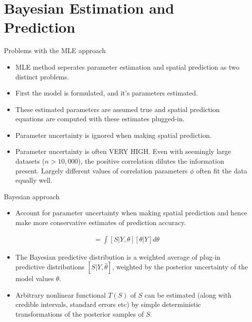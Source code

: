 \documentclass{beamer}
\begin{document}
\section{Bayesian Estimation and Prediction}

\begin{frame}{Problems with the MLE approach}

\begin{itemize}
\item MLE method seperates parameter estimation and spatial prediction as two distinct problems.
\item First the model is formulated, and it's parameters estimated.
\item These estimated parameters are assumed true and spatial prediction equations are computed with these estimates plugged-in.
\item Parameter uncertainty is ignored when making spatial prediction.
\item Parameter uncertainty is often VERY HIGH. Even with seemingly large datasets ($n > 10,000$), the positive correlation dilutes the information present. Largely different values of correlation parameters $\phi$ often fit the data equally well.
\end{itemize}

\end{frame}

\begin{frame}{Bayesian approach}

\begin{itemize}
\item Account for parameter uncertainty when making spatial prediction and hence make more conservative estimates of prediction accuracy.
\end{itemize}

\begin{align*}
[S | Y ] = \int [S | Y, \theta ] [ \theta | Y ] d \theta
\end{align*}

\begin{itemize}
\item The Bayesian predictive distribution is a weighted average of plug-in predictive distributions $[S | Y, \hat{\theta} ]$, weighted by the posterior uncertainty of the model values $\theta$.
\item Arbitrary nonlinear functional $T(S)$ of $S$ can be estimated (along with credible intervals, standard errors etc) by simple deterministic transformations of the posterior samples of $S$.
\end{itemize}

\end{frame}
\end{document}
